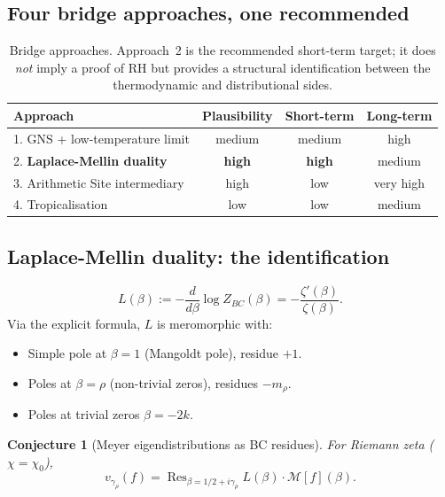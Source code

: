 \documentclass[11pt,a4paper]{article}
\theoremstyle{plain}
\newtheorem{conjecture}[theorem]{Conjecture}
\theoremstyle{definition}
\DeclareMathOperator{\Res}{Res}
\newcommand{\chifn}{\chi}
\begin{document}
\subsection{Four bridge approaches, one recommended}

\begin{table}[h]
\centering
\begin{tabular}{@{}lccc@{}}
\toprule
\textbf{Approach} & \textbf{Plausibility} & \textbf{Short-term} & \textbf{Long-term} \\
\midrule
1. GNS + low-temperature limit & medium & medium & high \\
2. \textbf{Laplace-Mellin duality} & \textbf{high} & \textbf{high} & medium \\
3. Arithmetic Site intermediary & high & low & very high \\
4. Tropicalisation & low & low & medium \\
\bottomrule
\end{tabular}
\caption{Bridge approaches.  Approach~2 is the recommended short-term target; it does \emph{not} imply a proof of RH but provides a structural identification between the thermodynamic and distributional sides.}
\label{tab:bridge-approaches}
\end{table}

\subsection{Laplace-Mellin duality: the identification}

\begin{equation}
\label{eq:log-z-deriv}
  L(\beta) := -\frac{d}{d\beta} \log Z_{BC}(\beta)
    = -\frac{\zeta'(\beta)}{\zeta(\beta)}.
\end{equation}
Via the explicit formula, $L$ is meromorphic with:
\begin{itemize}
  \item Simple pole at $\beta = 1$ (Mangoldt pole), residue $+1$.
  \item Poles at $\beta = \rho$ (non-trivial zeros), residues $-m_\rho$.
  \item Poles at trivial zeros $\beta = -2k$.
\end{itemize}

\begin{conjecture}[Meyer eigendistributions as BC residues]
\label{conj:meyer-bc}
For Riemann zeta ($\chifn = \chifn_0$),
\[
  v_{\gamma_\rho}(f) = \Res_{\beta = 1/2 + i\gamma_\rho}
    L(\beta) \cdot \mathcal M[f](\beta).
\]
\end{conjecture}
\end{document}

